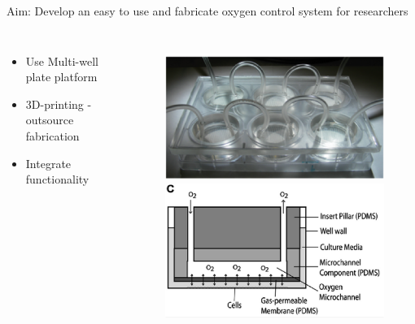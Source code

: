 \documentclass{beamer}
\begin{document}
\begin{frame}{Aim: Develop an easy to use and fabricate oxygen control system for researchers}
\begin{columns}[c] %
\begin{itemize}
\item Use Multi-well plate platform
\item 3D-printing - outsource fabrication
\item Integrate functionality 
 \end{itemize}
\begin{figure}
\includegraphics[width=.8\linewidth]{images/oppegard1.png}\\
\includegraphics[width=.8\linewidth]{images/oppegard2.png}\\
\hspace*{11pt}\hbox{\scriptsize {}}
 \end{figure}
\end{columns}
\end{frame}
\end{document}
